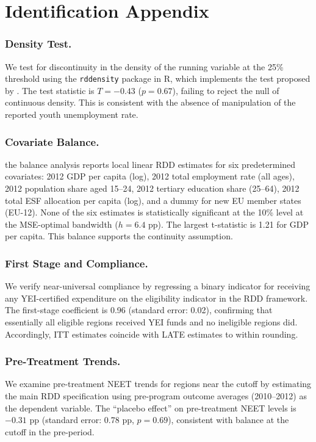 \documentclass[12pt]{article}
\begin{document}
\section{Identification Appendix}
\label{sec:appB}

\subsubsection*{Density Test.} We test for discontinuity in the density of the running variable at the 25\% threshold using the \texttt{rddensity} package in R, which implements the test proposed by \citet{cattaneo2020practical}. The test statistic is $T = -0.43$ ($p = 0.67$), failing to reject the null of continuous density. This is consistent with the absence of manipulation of the reported youth unemployment rate.

\subsubsection*{Covariate Balance.} the balance analysis reports local linear RDD estimates for six predetermined covariates: 2012 GDP per capita (log), 2012 total employment rate (all ages), 2012 population share aged 15--24, 2012 tertiary education share (25--64), 2012 total ESF allocation per capita (log), and a dummy for new EU member states (EU-12). None of the six estimates is statistically significant at the 10\% level at the MSE-optimal bandwidth ($h = 6.4$ pp). The largest t-statistic is 1.21 for GDP per capita. This balance supports the continuity assumption.


\subsubsection*{First Stage and Compliance.} We verify near-universal compliance by regressing a binary indicator for receiving any YEI-certified expenditure on the eligibility indicator in the RDD framework. The first-stage coefficient is 0.96 (standard error: 0.02), confirming that essentially all eligible regions received YEI funds and no ineligible regions did. Accordingly, ITT estimates coincide with LATE estimates to within rounding.

\subsubsection*{Pre-Treatment Trends.} We examine pre-treatment NEET trends for regions near the cutoff by estimating the main RDD specification using pre-program outcome averages (2010--2012) as the dependent variable. The ``placebo effect'' on pre-treatment NEET levels is $-0.31$ pp (standard error: 0.78 pp, $p = 0.69$), consistent with balance at the cutoff in the pre-period.
\end{document}
